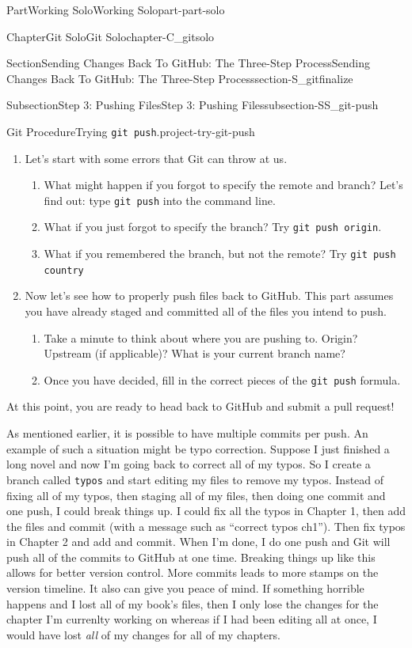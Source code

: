 \documentclass[oneside,10pt,]{book}
\newcommand{\mono}[1]{\texttt{#1}}
\begin{document}
\begin{partptx}{Part}{Working Solo}{}{Working Solo}{}{}{part-part-solo}
\begin{chapterptx}{Chapter}{Git Solo}{}{Git Solo}{}{}{chapter-C_gitsolo}
\begin{sectionptx}{Section}{Sending Changes Back To GitHub: The Three-Step Process}{}{Sending Changes Back To GitHub: The Three-Step Process}{}{}{section-S_gitfinalize}
\begin{subsectionptx}{Subsection}{Step 3: Pushing Files}{}{Step 3: Pushing Files}{}{}{subsection-SS_git-push}
\begin{project}{Git Procedure}{Trying \mono{git push}.}{project-try-git-push}
\begin{enumerate}[font=\bfseries,label=(\alph*),ref=\alph*]%
\item{}Let's start with some errors that Git can throw at us.%
\begin{enumerate}[font=\bfseries,label=(\roman*),ref=\theenumi.\roman*]%
\item{}What might happen if you forgot to specify the remote and branch? Let's find out: type \mono{git push} into the command line.%
\item{}What if you just forgot to specify the branch? Try \mono{git push origin}.%
\item{}What if you remembered the branch, but not the remote? Try \mono{git push country}%
\end{enumerate}%
\item{}Now let's see how to properly push files back to GitHub. This part assumes you have already staged and committed all of the files you intend to push.%
\begin{enumerate}[font=\bfseries,label=(\roman*),ref=\theenumi.\roman*]%
\item{}Take a minute to think about where you are pushing to. Origin? Upstream (if applicable)? What is your current branch name?%
\item{}Once you have decided, fill in the correct pieces of the \mono{git push} formula.%
\end{enumerate}%
\end{enumerate}%
At this point, you are ready to head back to GitHub and submit a pull request!%
\end{project}%
As mentioned earlier, it is possible to have multiple commits per push. An example of such a situation might be typo correction. Suppose I just finished a long novel and now I'm going back to correct all of my typos. So I create a branch called \mono{typos} and start editing my files to remove my typos. Instead of fixing all of my typos, then staging all of my files, then doing one commit and one push, I could break things up. I could fix all the typos in Chapter 1, then add the files and commit (with a message such as ``correct typos ch1''). Then fix typos in Chapter 2 and add and commit. When I'm done, I do one push and Git will push all of the commits to GitHub at one time. Breaking things up like this allows for better version control. More commits leads to more stamps on the version timeline. It also can give you peace of mind. If something horrible happens and I lost all of my book's files, then I only lose the changes for the chapter I'm currenlty working on whereas if I had been editing all at once, I would have lost \emph{all} of my changes for all of my chapters.%

\end{subsectionptx}
\end{sectionptx}
\end{chapterptx}
\end{partptx}
\end{document}
